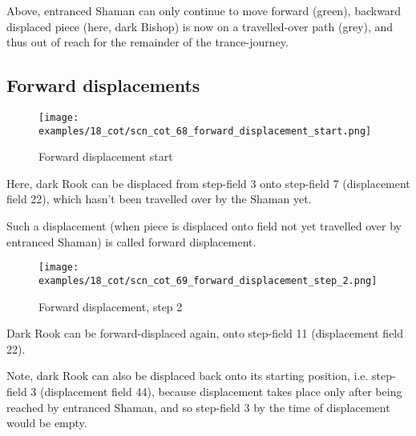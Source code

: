 Above, entranced Shaman can only continue to move forward (green), backward
displaced piece (here, dark Bishop) is now on a travelled-over path (grey),
and thus out of reach for the remainder of the trance-journey.

\clearpage %

\subsection*{Forward displacements}
\label{sec:Conquest of Tlalocan/Trance-journey/Forward displacements}

\vspace*{-1.0\baselineskip}
\noindent
\begin{figure}[!h]
\texttt{[image: examples/18\_cot/scn\_cot\_68\_forward\_displacement\_start.png]}
\caption{Forward displacement start}
\label{fig:scn_cot_68_forward_displacement_start}
\end{figure}

Here, dark Rook can be displaced from step-field 3 onto step-field 7 (displacement
field 22), which hasn't been travelled over by the Shaman yet.

Such a displacement (when piece is displaced onto field not yet travelled over by
entranced Shaman) is called forward displacement.

\clearpage %

\noindent
\begin{figure}[!h]
\texttt{[image: examples/18\_cot/scn\_cot\_69\_forward\_displacement\_step\_2.png]}
\caption{Forward displacement, step 2}
\label{fig:scn_cot_69_forward_displacement_step_2}
\end{figure}

Dark Rook can be forward-displaced again, onto step-field 11 (displacement field 22).

Note, dark Rook can also be displaced back onto its starting position, i.e. step-field
3 (displacement field 44), because displacement takes place only after being reached
by entranced Shaman, and so step-field 3 by the time of displacement would be empty.

\clearpage %

